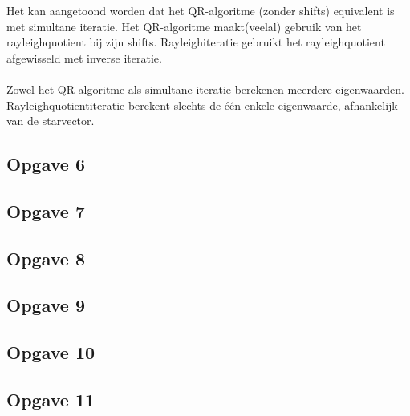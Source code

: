 \documentclass[een]{practicumverslag}
\begin{document}
Het kan aangetoond worden dat het QR-algoritme (zonder shifts) equivalent is met simultane iteratie. Het QR-algoritme maakt(veelal) gebruik van het rayleighquotient bij zijn shifts. Rayleighiteratie gebruikt het rayleighquotient afgewisseld met inverse iteratie.\\
\\
Zowel het QR-algoritme als simultane iteratie berekenen meerdere eigenwaarden.
Rayleighquotientiteratie berekent slechts de één enkele eigenwaarde, afhankelijk van de starvector.
\subsection*{Opgave 6}

\lipsum[7-7]

\subsection*{Opgave 7}

\lipsum[7-7]

\subsection*{Opgave 8}

\lipsum[7-7]

\subsection*{Opgave 9}

\lipsum[7-7]

\subsection*{Opgave 10}

\lipsum[7-7]

\subsection*{Opgave 11}

\lipsum[7-7]

\clearpage
\end{document}
